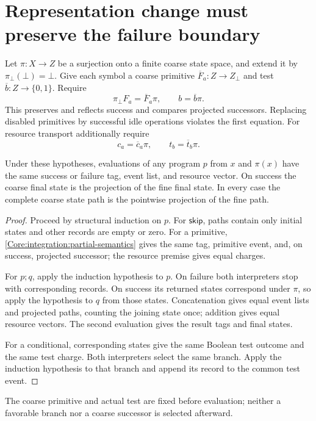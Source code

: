 \section{Representation change must preserve the failure boundary}
Let $\pi:X\to Z$ be a surjection onto a finite coarse state space, and extend it by $\pi_\bot(\bot)=\bot$. Give each symbol a coarse primitive $\overline F_a:Z\to Z_\bot$ and test $\overline b:Z\to\{0,1\}$. Require
\begin{equation}\label{Core:integration:partial-semantics}
\pi_\bot F_a=\overline F_a\pi,\qquad b=\overline b\pi.
\end{equation}
This preserves and reflects success and compares projected successors. Replacing disabled primitives by successful idle operations violates the first equation. For resource transport additionally require
\[
c_a=\overline c_a\pi,\qquad t_b=\overline t_b\pi.
\]

\begin{Coretheorem}\label{Core:integration:execution-quotient}
Under these hypotheses, evaluations of any program $p$ from $x$ and $\pi(x)$ have the same success or failure tag, event list, and resource vector. On success the coarse final state is the projection of the fine final state. In every case the complete coarse state path is the pointwise projection of the fine path.
\end{Coretheorem}
\begin{proof}
Proceed by structural induction on $p$. For $\mathsf{skip}$, paths contain only initial states and other records are empty or zero. For a primitive, \eqref{Core:integration:partial-semantics} gives the same tag, primitive event, and, on success, projected successor; the resource premise gives equal charges.

For $p;q$, apply the induction hypothesis to $p$. On failure both interpreters stop with corresponding records. On success its returned states correspond under $\pi$, so apply the hypothesis to $q$ from those states. Concatenation gives equal event lists and projected paths, counting the joining state once; addition gives equal resource vectors. The second evaluation gives the result tags and final states.

For a conditional, corresponding states give the same Boolean test outcome and the same test charge. Both interpreters select the same branch. Apply the induction hypothesis to that branch and append its record to the common test event.
\end{proof}
The coarse primitive and actual test are fixed before evaluation; neither a favorable branch nor a coarse successor is selected afterward.

